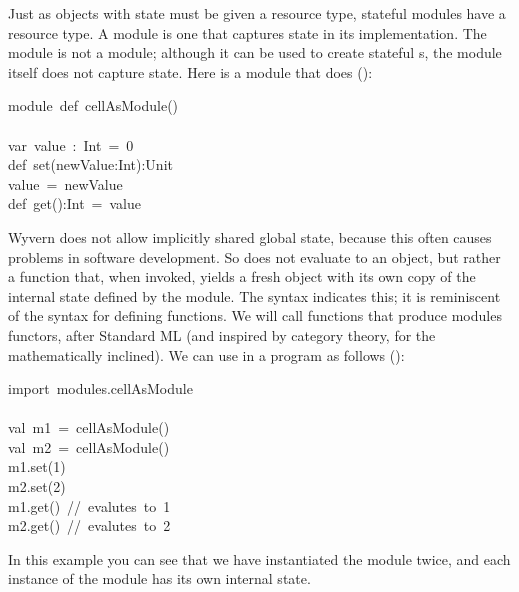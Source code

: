 \documentclass{article}
\begin{document}
\noindent{}Just as objects with state must be given a resource type, stateful
modules have a resource type.  A  module is one that captures
state in its implementation.  The  module is not a 
module; although it can be used to create stateful s, the module
itself does not capture state.  Here is a module that does ():%
\begin{mdpre}%
\noindent module~def~cellAsModule()\\
\\
var~value~:~Int~=~0\\
def~set(newValue:Int):Unit\\
value~=~newValue\\
def~get():Int~=~value%
\end{mdpre}\noindent{}Wyvern does not allow implicitly shared global state, because this
often causes problems in software development.  So  does
not evaluate to an object, but rather a function that, when invoked,
yields a fresh object with its own copy of the internal state defined
by the module.  The  syntax indicates this; it is reminiscent
of the  syntax for defining functions.  We will call functions that
produce modules functors, after Standard ML (and inspired by category
theory, for the mathematically inclined).  We can use  in
a program as follows ():
\begin{mdpre}%
\noindent import~modules.cellAsModule\\
\\
val~m1~=~cellAsModule()~~~~\\
val~m2~=~cellAsModule()\\
m1.set(1)\\
m2.set(2)\\
m1.get()~//~evalutes~to~1\\
m2.get()~//~evalutes~to~2%
\end{mdpre}\noindent{}In this example you can see that we have instantiated the 
module  twice, and each instance of the module has its
own internal state.
\begin{mdpre}%
\noindent%
\end{mdpre}
\end{document}
